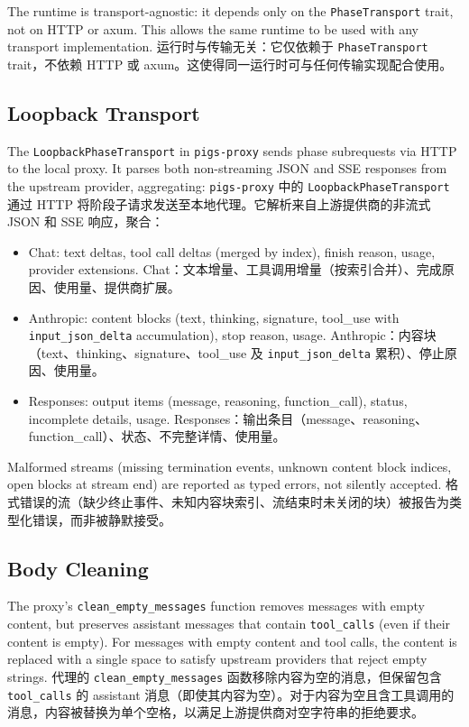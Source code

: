 The runtime is transport-agnostic: it depends only on the \texttt{PhaseTransport} trait, not on HTTP or axum. This allows the same runtime to be used with any transport implementation.
运行时与传输无关：它仅依赖于 \texttt{PhaseTransport} trait，不依赖 HTTP 或 axum。这使得同一运行时可与任何传输实现配合使用。

\subsection{Loopback Transport}

The \texttt{LoopbackPhaseTransport} in \texttt{pigs-proxy} sends phase subrequests via HTTP to the local proxy. It parses both non-streaming JSON and SSE responses from the upstream provider, aggregating:
\texttt{pigs-proxy} 中的 \texttt{LoopbackPhaseTransport} 通过 HTTP 将阶段子请求发送至本地代理。它解析来自上游提供商的非流式 JSON 和 SSE 响应，聚合：
\begin{itemize}[nosep]
    \item Chat: text deltas, tool call deltas (merged by index), finish reason, usage, provider extensions.
    Chat：文本增量、工具调用增量（按索引合并）、完成原因、使用量、提供商扩展。
    \item Anthropic: content blocks (text, thinking, signature, tool\_use with \texttt{input\_json\_delta} accumulation), stop reason, usage.
    Anthropic：内容块（text、thinking、signature、tool\_use 及 \texttt{input\_json\_delta} 累积）、停止原因、使用量。
    \item Responses: output items (message, reasoning, function\_call), status, incomplete details, usage.
    Responses：输出条目（message、reasoning、function\_call）、状态、不完整详情、使用量。
\end{itemize}

Malformed streams (missing termination events, unknown content block indices, open blocks at stream end) are reported as typed errors, not silently accepted.
格式错误的流（缺少终止事件、未知内容块索引、流结束时未关闭的块）被报告为类型化错误，而非被静默接受。

\subsection{Body Cleaning}

The proxy's \texttt{clean\_empty\_messages} function removes messages with empty content, but preserves assistant messages that contain \texttt{tool\_calls} (even if their content is empty). For messages with empty content and tool calls, the content is replaced with a single space to satisfy upstream providers that reject empty strings.
代理的 \texttt{clean\_empty\_messages} 函数移除内容为空的消息，但保留包含 \texttt{tool\_calls} 的 assistant 消息（即使其内容为空）。对于内容为空且含工具调用的消息，内容被替换为单个空格，以满足上游提供商对空字符串的拒绝要求。

